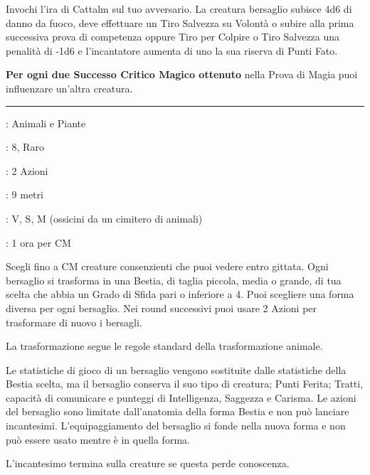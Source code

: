 \begin{multicols}{2}
Invochi l'ira di Cattalm sul tuo avversario. La creatura bersaglio subisce 4d6 di danno da fuoco, deve effettuare un Tiro Salvezza su Volontà o subire alla prima successiva prova di competenza oppure Tiro per Colpire o Tiro Salvezza una penalità di -1d6 e l'incantatore aumenta di uno la sua riserva di Punti Fato.

\textbf{Per ogni due Successo Critico Magico ottenuto} nella Prova di Magia puoi influenzare un'altra creatura.

\smallskip\noindent\rule{\linewidth}{2pt} \hypertarget{Benedizioni di Efrem}{}\medskip{}\label{Animal Shapes}
\noindent
\begin{description}[noitemsep, topsep=0pt, parsep=0pt, partopsep=0pt, leftmargin=0cm, labelwidth=2.8cm]
	\item[\textbf{Lista magia}] : Animali e Piante
	\item[\textbf{Livello}] : 8, Raro
	\item[\textbf{T. di Lancio}] : 2 Azioni
	\item[\textbf{Gittata}] : 9 metri
	\item[\textbf{Componenti}] : V, S, M (ossicini da un cimitero di animali)
	\item[\textbf{Durata}] : 1 ora per CM
\end{description}

Scegli fino a CM creature consenzienti che puoi vedere entro gittata. Ogni bersaglio si trasforma in una Bestia, di taglia piccola, media o grande, di tua scelta che abbia un Grado di Sfida pari o inferiore a 4. Puoi scegliere una forma diversa per ogni bersaglio. Nei round successivi puoi usare 2 Azioni per trasformare di nuovo i bersagli.

La trasformazione segue le regole standard della trasformazione animale.

Le statistiche di gioco di un bersaglio vengono sostituite dalle statistiche della Bestia scelta, ma il bersaglio conserva il suo tipo di creatura; Punti Ferita; Tratti, capacità di comunicare e punteggi di Intelligenza, Saggezza e Carisma. Le azioni del bersaglio sono limitate dall'anatomia della forma Bestia e non può lanciare incantesimi. L'equipaggiamento del bersaglio si fonde nella nuova forma e non può essere usato mentre è in quella forma.

L'incantesimo termina sulla creature se questa perde conoscenza.


\end{multicols}
